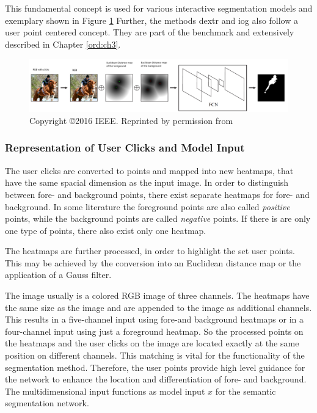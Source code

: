 This fundamental concept is used for various interactive segmentation models \cite{Xu16-InteractiveObjectSelection} \cite{MVL18-ITIS} and exemplary shown in Figure \ref{fig:ch2:sec3:ifcn}
Further, the methods \gls{dextr}  \cite{Man18-DEXTR} and \gls{iog} \cite{Zha20-IOG} also follow a user point centered concept. They are part of the benchmark and extensively described in Chapter \ref{ord:ch3}.
\begin{figure}
	\includegraphics[width=\linewidth]{figures/chap232_ifcn.png}
	\caption[Interactively Fully Convolutional Network]{Copyright \copyright 2016 IEEE. Reprinted by permission from \cite{Xu16-InteractiveObjectSelection}}
	\label{fig:ch2:sec3:ifcn}
\end{figure}

\subsubsection{Representation of User Clicks and Model Input}
The user clicks are converted to points and mapped into new heatmaps, that have the same spacial dimension as the input image.
In order to distinguish between fore- and background points, there exist separate heatmaps for fore- and background.
In some literature the foreground points are also called \textit{positive} points, while the background points are called \textit{negative} points.
If there is are only one type of points, there also exist only one heatmap.

The heatmaps are further processed, in order to highlight the set user points.
This may be achieved by the conversion into an Euclidean distance map \cite{Dan80-EuclideanDistanceMapping} or the application of a Gauss filter.

The image usually is a colored RGB image of three channels.
The heatmaps have the same size as the image and are appended to the image as additional channels.
This results in a five-channel input using fore-and background heatmaps or in a four-channel input using just a foreground heatmap.
So the processed points on the heatmaps and the user clicks on the image are located exactly at the same position on different channels.
This matching is vital for the functionality of the segmentation method.
Therefore, the user points provide high level guidance for the network to enhance the location and differentiation of fore- and background.
The multidimensional input functions as model input $x$ for the semantic segmentation network.

